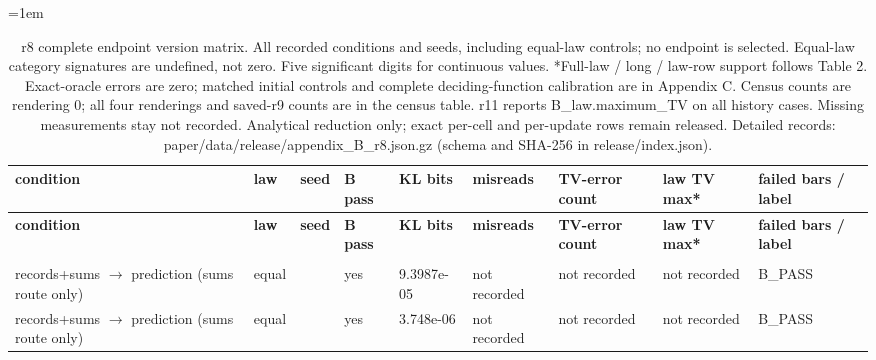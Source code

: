 \begingroup\fontsize{8}{9.5}\selectfont\setlength{\tabcolsep}{3pt}\emergencystretch=1em
\begin{longtable}{@{}>{\raggedright\arraybackslash}p{1.030in}>{\raggedright\arraybackslash}p{0.400in}>{\raggedright\arraybackslash}p{0.290in}>{\raggedright\arraybackslash}p{0.390in}>{\raggedright\arraybackslash}p{0.580in}>{\raggedright\arraybackslash}p{0.550in}>{\raggedright\arraybackslash}p{0.570in}>{\raggedright\arraybackslash}p{0.570in}>{\raggedright\arraybackslash}p{1.300in}@{}}
\caption{r8 complete endpoint version matrix. All recorded conditions and seeds, including equal-law controls; no endpoint is selected. Equal-law category signatures are undefined, not zero. Five significant digits for continuous values. *Full-law /\allowbreak{} long /\allowbreak{} law-row support follows Table 2. Exact-oracle errors are zero; matched initial controls and complete deciding-function calibration are in Appendix C. Census counts are rendering 0; all four renderings and saved-r9 counts are in the census table. r11 reports B\_\allowbreak{}law.maximum\_\allowbreak{}TV on all history cases. Missing measurements stay not recorded. Analytical reduction only; exact per-cell and per-update rows remain released. Detailed records: paper/\allowbreak{}data/\allowbreak{}release/\allowbreak{}appendix\_\allowbreak{}B\_\allowbreak{}r8.json.gz (schema and SHA-256 in release/\allowbreak{}index.json).}\label{tab:appendix_B_r8}\\
\toprule
\textbf{condition} & \textbf{law} & \textbf{seed} & \textbf{B pass} & \textbf{KL bits} & \textbf{misreads} & \textbf{TV-error count} & \textbf{law TV max*} & \textbf{failed bars /\allowbreak{} label} \\
\midrule\endfirsthead
\toprule
\textbf{condition} & \textbf{law} & \textbf{seed} & \textbf{B pass} & \textbf{KL bits} & \textbf{misreads} & \textbf{TV-error count} & \textbf{law TV max*} & \textbf{failed bars /\allowbreak{} label} \\
\midrule\endhead
\midrule\multicolumn{9}{r}{Continued on next page}\\\endfoot
\bottomrule\endlastfoot
records+sums $\to$ prediction (sums route only) & equal & 0 & yes & 9.3987e-05 & not recorded & not recorded & not recorded & B\_\allowbreak{}PASS \\
records+sums $\to$ prediction (sums route only) & equal & 1 & yes & 3.748e-06 & not recorded & not recorded & not recorded & B\_\allowbreak{}PASS \\

\end{longtable}
